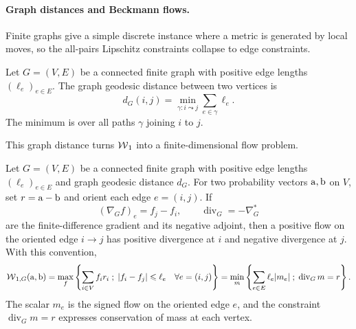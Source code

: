 \paragraph{Graph distances and Beckmann flows.}
Finite graphs give a simple discrete instance where a metric is generated by local moves, so the all-pairs Lipschitz constraints collapse to edge constraints.

\begin{defn}\label{def-graph-geodesic-distance}
	Let $G=(V,E)$ be a connected finite graph with positive edge lengths $(\ell_e)_{e\in E}$. The graph geodesic distance between two vertices is
	\[
		d_G(i,j)=\min_{\gamma:i\leadsto j}\sum_{e\in\gamma}\ell_e.
	\]
	The minimum is over all paths $\gamma$ joining $i$ to $j$.
\end{defn}
This graph distance turns $\operatorname{\mathcal{W}}_1$ into a finite-dimensional flow problem.

\begin{prop}\label{prop-graph-w1-beckmann}
	Let $G=(V,E)$ be a connected finite graph with positive edge lengths $(\ell_e)_{e\in E}$ and graph geodesic distance $d_G$.
	For two probability vectors $\mathrm{a},\mathrm{b}$ on $V$, set $r=\mathrm{a}-\mathrm{b}$ and orient each edge $e=(i,j)$. If
	\[
		(\nabla_G f)_e=f_j-f_i,\qquad
		\operatorname{div}_G=-\nabla_G^*
	\]
	are the finite-difference gradient and its negative adjoint, then a positive flow on the oriented edge $i\to j$ has positive divergence at $i$ and negative divergence at $j$. With this convention,
	\[
		\operatorname{\mathcal{W}}_{1,G}(\mathrm{a},\mathrm{b})
		=
		\max_f \left\{ \sum_{i\in V} f_i r_i \;;\; |f_i-f_j|\leqslant \ell_e\quad\forall e=(i,j) \right\}
		=
		\min_m \left\{ \sum_{e\in E}\ell_e |m_e| \;;\; \operatorname{div}_G m=r \right\}.
	\]
	The scalar $m_e$ is the signed flow on the oriented edge $e$, and the constraint $\operatorname{div}_G m=r$ expresses conservation of mass at each vertex.
\end{prop}

